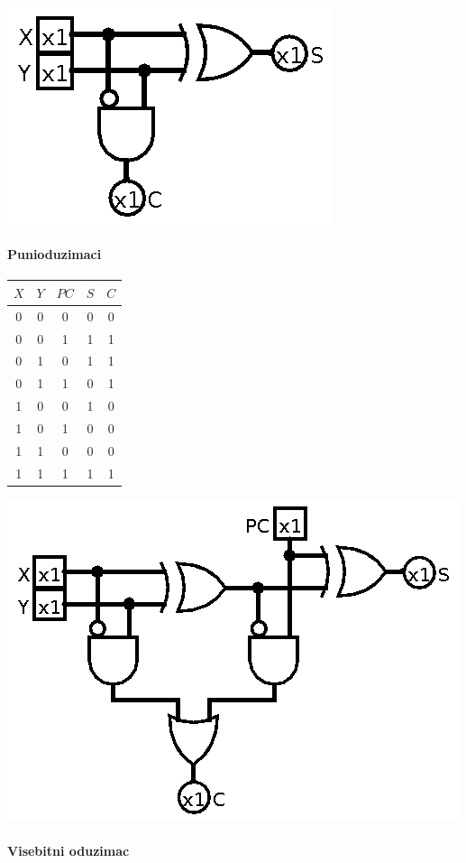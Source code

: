 \documentclass[12p,a4paper]{article}
\begin{document}
\begin{multicols}{2}
    \includegraphics[width=0.5\columnwidth]{Figures/half_sub.png}

    \paragraph{Punioduzimaci}

    \begin{tabular}{*{5}{c}}
        $X$ & $Y$ & $PC$ & $S$ & $C$ \\
        \midrule
         0  &  0 &  0  &  0  &  0  \\
         0  &  0 &  1  &  1  &  1  \\
         0  &  1 &  0  &  1  &  1  \\
         0  &  1 &  1  &  0  &  1  \\
         1  &  0 &  0  &  1  &  0  \\
         1  &  0 &  1  &  0  &  0  \\
         1  &  1 &  0  &  0  &  0  \\
         1  &  1 &  1  &  1  &  1  \\
    
    \end{tabular}

    \includegraphics[width=0.7\columnwidth]{Figures/full_sub.png}

    \paragraph{Visebitni oduzimac}


\end{multicols}
\end{document}
